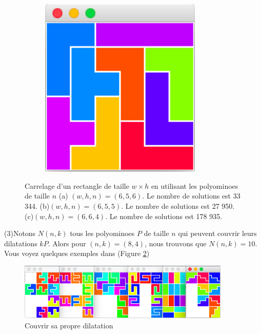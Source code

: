 \documentclass[a4paper,12pt]{article}
\begin{document}
\begin{figure}[h!]
\begin{subfigure}[h]{0.3\textwidth}
		\caption{}
	\end{subfigure}
	\hspace{0.03\textwidth}
	\begin{subfigure}[h]{0.3\textwidth}
		\centering
		\includegraphics[width=0.85\textwidth]{figures/664.png}
		\caption{}
	\end{subfigure}
	\caption{\label{fig:task8_2} Carrelage d'un rectangle de taille $w \times h$ en utilisant les polyominoes de taille $n$ (a) $(w,h,n)=(6,5,6)$. Le nombre de solutions est 33 344. (b)$(w,h,n)=(6,5,5)$. Le nombre de solutions est 27 950. (c)$(w,h,n)=(6,6,4)$. Le nombre de solutions est 178 935.}
\end{figure}

\bigskip
\noindent (3)Notons $N(n,k)$ tous les polyominoes $P$ de taille $n$ qui peuvent couvrir leurs dilatations $kP$. Alors pour $(n,k)=(8,4)$, nous trouvons que $N(n,k)=10$. Vous voyez quelques exemples dans (Figure \ref{fig:task83})
\begin{figure}[h]
	\centering
	\includegraphics[width=0.9\textwidth]{figures/task8_3}
	\caption{\label{fig:task83} Couvrir sa propre dilatation}
\end{figure}
\end{document}
